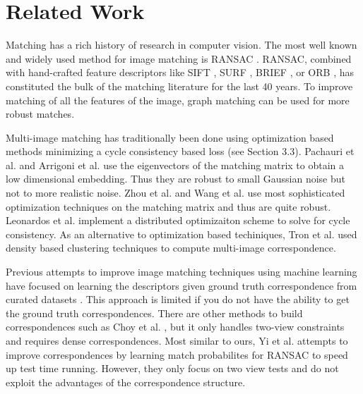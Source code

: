 \documentclass[10pt,twocolumn,letterpaper]{article}
\begin{document}
\section{Related Work}

Matching has a rich history of research in computer vision.
The most well known and widely used method for image matching is RANSAC \cite{fischler1981random}.
RANSAC, combined with hand-crafted feature descriptors like SIFT \cite{lowe2004distinctive}, SURF \cite{bay2006surf}, BRIEF \cite{calonder2012brief}, or ORB \cite{mur2015orb}, has constituted the bulk of the matching literature for the last 40 years.
To improve matching of all the features of the image, graph matching \cite{suh2015subgraph, hu2016distributable} can be used for more robust matches.

Multi-image matching has traditionally been done using optimization based methods minimizing a cycle consistency based loss (see Section 3.3).
Pachauri et al. \cite{pachauri2013solving} and Arrigoni et al. \cite{arrigoni2017synchronization} use the eigenvectors of the matching matrix to obtain a low dimensional embedding. 
Thus they are robust to small Gaussian noise but not to more realistic noise.
Zhou et al. \cite{zhou2015multi} and Wang et al. \cite{wang2017multi} use most sophisticated optimization techniques on the matching matrix and thus are quite robust.
Leonardos et al. \cite{leonardos2016distributed} implement a distributed optimizaiton scheme to solve for cycle consistency.
As an alternative to optimization based techiniques, Tron et al. \cite{tron2017fast} used density based clustering techniques to compute multi-image correspondence.

Previous attempts to improve image matching techniques using machine learning have focused on learning the descriptors given ground truth correspondence from curated datasets \cite{zagoruyko2015learning, yi2016lift, brachmann2017dsac}.
This approach is limited if you do not have the ability to get the ground truth correspondences.
There are other methods to build correspondences such as Choy et al. \cite{choy2016universal}, but it only handles two-view constraints and requires dense correspondences.
Most similar to ours, Yi et al. \cite{yi2018learning} attempts to improve correspondences by learning match probabilites for RANSAC to speed up test time running.
However, they only focus on two view tests and do not exploit the advantages of the correspondence structure.
\end{document}

